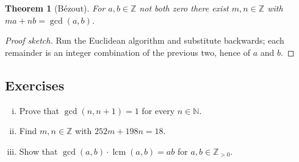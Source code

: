 \documentclass[11pt]{article}
\newtheorem{theorem}{Theorem}[section]
\theoremstyle{definition}
\theoremstyle{remark}
\newcommand{\N}{\mathbb{N}}
\newcommand{\Z}{\mathbb{Z}}
\DeclareMathOperator{\lcm}{lcm}
\begin{document}
\begin{theorem}[B\'ezout]
For $a, b \in \Z$ not both zero there exist $m, n \in \Z$ with
$ma + nb = \gcd(a, b)$.
\end{theorem}

\begin{proof}[Proof sketch]
Run the Euclidean algorithm and substitute backwards; each remainder is an
integer combination of the previous two, hence of $a$ and $b$.
\end{proof}

\subsection*{Exercises}
\begin{enumerate}[(i)]
  \item Prove that $\gcd(n, n+1) = 1$ for every $n \in \N$.
  \item Find $m, n \in \Z$ with $252m + 198n = 18$.
  \item Show that $\gcd(a,b) \cdot \lcm(a,b) = ab$ for $a, b \in \Z_{>0}$.
\end{enumerate}
\end{document}
